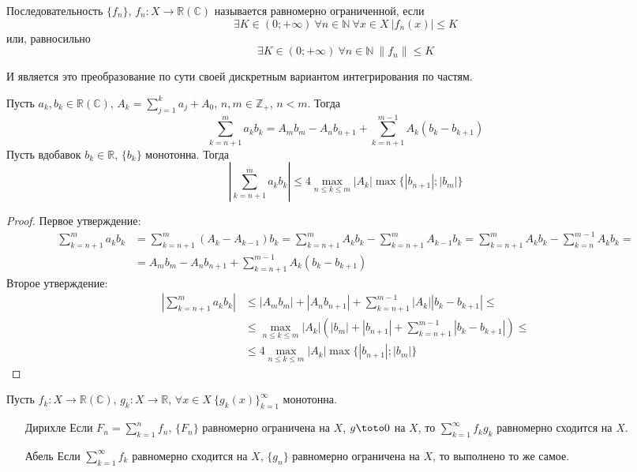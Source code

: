 \documentclass{article}
\begin{document}
    \begin{definition}
        Последовательность $\{f_n\}$, $f_n\colon X\to\mathbb R(\mathbb C)$ называется равномерно ограниченной, если
        $$
        \exists K\in(0;+\infty)~\forall n\in\mathbb N~\forall x\in X~|f_n(x)|\leqslant K
        $$
        или, равносильно
        $$
        \exists K\in(0;+\infty)~\forall n\in\mathbb N~\|f_n\|\leqslant K
        $$
    \end{definition}
    \begin{remark}
        И является это преобразование по сути своей дискретным вариантом интегрирования по частям.
    \end{remark}
    \begin{lemma}
        Пусть $a_k,b_k\in\mathbb R(\mathbb C)$, $A_k=\sum\limits_{j=1}^ka_j+A_0$, $n,m\in\mathbb Z_+$, $n<m$. Тогда
        $$
        \sum\limits_{k=n+1}^ma_kb_k=A_mb_m-A_nb_{n+1}+\sum\limits_{k=n+1}^{m-1}A_k(b_k-b_{k+1})
        $$
        Пусть вдобавок $b_k\in\mathbb R$, $\{b_k\}$ монотонна. Тогда
        $$
        \left|\sum\limits_{k=n+1}^m a_kb_k\right|\leqslant4\max\limits_{n\leqslant k\leqslant m}|A_k|\max\{|b_{n+1}|;|b_m|\}
        $$
    \end{lemma}
    \begin{proof}
        Первое утверждение:
        \[\begin{split}
            \sum\limits_{k=n+1}^ma_kb_k&=\sum\limits_{k=n+1}^m(A_k-A_{k-1})b_k=\sum\limits_{k=n+1}^mA_kb_k-\sum\limits_{k=n+1}^mA_{k-1}b_k=\sum\limits_{k=n+1}^mA_kb_k-\sum\limits_{k=n}^{m-1}A_kb_k=\\&=A_mb_m-A_nb_{n+1}+\sum\limits_{k=n+1}^{m-1}A_k(b_k-b_{k+1})
        \end{split}\]
        Второе утверждение:
        \[\begin{split}
            \left|\sum\limits_{k=n+1}^m a_kb_k\right|&\leqslant |A_mb_m|+|A_nb_{n+1}|+\sum\limits_{k=n+1}^{m-1}|A_k||b_k-b_{k+1}|\leqslant\\&\leqslant\max\limits_{n\leqslant k\leqslant m}|A_k|\left(|b_m|+|b_{n+1}|+\sum\limits_{k=n+1}^{m-1}|b_k-b_{k+1}|\right)\leqslant\\&\leqslant4\max\limits_{n\leqslant k\leqslant m}|A_k|\max\{|b_{n+1}|;|b_m|\}
        \end{split}\]
    \end{proof}
    \begin{theorem}
        Пусть $f_k\colon X\to\mathbb R(\mathbb C)$, $g_k\colon X\to\mathbb R$, $\forall x\in X~\{g_k(x)\}_{k=1}^\infty$ монотонна.
        \begin{itemize}
            \item[Дирихле] Если $F_n=\sum\limits_{k=1}^nf_n$, $\{F_n\}$ равномерно ограничена на $X$, $g\toto0$ на $X$, то $\sum\limits_{k=1}^\infty f_kg_k$ равномерно сходится на $X$.
            \item[Абель] Если $\sum\limits_{k=1}^\infty f_k$ равномерно сходится на $X$, $\{g_n\}$ равномерно ограничена на $X$, то выполнено то же самое.
        \end{itemize}
    \end{theorem}
\end{document}
